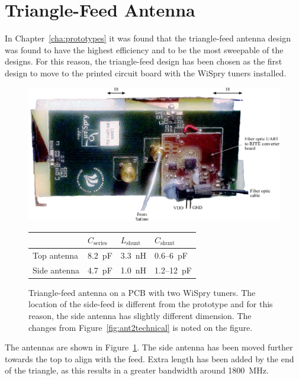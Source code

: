 \section{Triangle-Feed Antenna}

In Chapter~\ref{cha:prototypes} it was found that the triangle-feed antenna design was found to have the highest efficiency and to be the most sweepable of the designs. For this reason, the triangle-feed design has been chosen as the first design to move to the printed circuit board with the WiSpry tuners installed. 

\begin{figure}[htbp]
    \centering
    \includegraphics{img/tech_sol/pcb_trianglefeed/pcb_enh}\\[2em]
    \footnotesize
    \begin{tabular}{|l|l|l|l|}
        \hline
        & $C_{\text{series}}$ & $L_{\text{shunt}}$ & $C_{\text{shunt}}$ \\
        \hline
        Top antenna & \SI{8.2}{pF} & \SI{3.3}{nH} & 0.6--\SI{6}{pF} \\
        Side antenna & \SI{4.7}{pF} & \SI{1.0}{nH} & 1.2--\SI{12}{pF} \\
        \hline
    \end{tabular}
    \caption{Triangle-feed antenna on a PCB with two WiSpry tuners. The location of the side-feed is different from the prototype and for this reason, the side antenna has slightly different dimension. The changes from Figure~\ref{fig:ant2technical} is noted on the figure.}
    \label{fig:triang_pcb_enh}
\end{figure}

The antennas are shown in Figure~\ref{fig:triang_pcb_enh}. The side antenna has been moved further towards the top to align with the feed. Extra length has been added by the end of the triangle, as this results in a greater bandwidth around \SI{1800}{MHz}.

